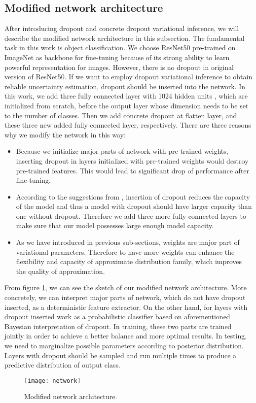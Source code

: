 \subsection{Modified network architecture}
After introducing dropout and concrete dropout variational inference, we will describe the modified network architecture in this subsection. The fundamental task in this work is object classification. We choose ResNet50\cite{he2016deep} pre-trained on ImageNet as backbone for fine-tuning because of its strong ability to learn powerful representation for images. However, there is no dropout in original version of ResNet50. If we want to employ dropout variational inference to obtain reliable uncertainty estimation, dropout should be inserted into the network. In this work, we add three fully connected layer with 1024 hidden units , which are initialized from scratch, before the output layer whose dimension needs to be set to the number of classes. Then we add concrete dropout at flatten layer, and these three new added fully connected layer, respectively.
There are three reasons why we modify the network in this way:
\begin{itemize}
	\item Because we initialize major parts of network with pre-trained weights, inserting dropout in layers initialized with pre-trained weights would destroy pre-trained features. This would lead to significant drop of performance after fine-tuning. 
	\item According to the suggestions from \cite{srivastava2014dropout}, insertion of dropout reduces the capacity of the model and thus a model with	dropout should have larger capacity than one without dropout. Therefore we add three more fully connected layers to make sure that our model possesses large enough model capacity.
	\item As we have introduced in previous sub-sections, weights are major part of variational parameters. Therefore to have more weights can enhance the flexibility and capacity of approximate distribution family, which improves the quality of approximation.  
\end{itemize}

From figure \ref{fig:modified_net}, we can see the sketch of our modified network architecture. More concretely, we can interpret major parts of network, which do not have dropout inserted, as a deterministic feature extractor. On the other hand, for layers with dropout inserted work as a probabilistic classifier based on aforementioned Bayesian interpretation of dropout. In training, these two parts are trained jointly in order to achieve a better balance and more optimal results. In testing, we need to marginalize possible parameters according to posterior distribution. Layers with dropout should be sampled and run multiple times to produce a predictive distribution of output class.
\begin{figure}[h!]
	\begin{center}
		\texttt{[image: network]}
		\caption{Modified network architecture.}		
		\label{fig:modified_net}
	\end{center}
\end{figure}


